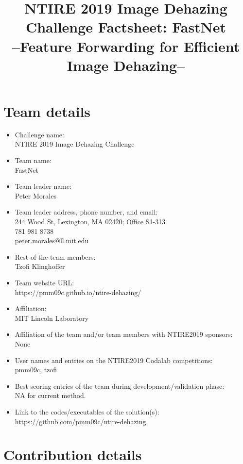 \documentclass[12pt]{article}
\title{NTIRE 2019 Image Dehazing Challenge Factsheet: FastNet\\--Feature Forwarding for Efficient Image Dehazing--}
\begin{document}
\maketitle
\sloppy

\section{Team details}

\begin{itemize}
\item Challenge name: \\ NTIRE 2019 Image Dehazing Challenge
\item Team name: \\FastNet                                 
\item Team leader name: \\Peter Morales                          
\item Team leader address, phone number, and email: \\244 Wood St, Lexington, MA 02420; Office S1-313\\ 781 981 8738\\ peter.morales@ll.mit.edu
\item Rest of the team members: \\Tzofi Klinghoffer       
\item Team website URL: \\https://pmm09c.github.io/ntire-dehazing/                    
\item Affiliation: \\MIT Lincoln Laboratory
\item Affiliation of the team and/or team members with NTIRE2019 sponsors: \\None
\item User names and entries on the NTIRE2019 Codalab competitions: \\pmm09c, tzofi
\item Best scoring entries of the team during development/validation phase: \\NA for current method.
\item Link to the codes/executables of the solution(s): \\https://github.com/pmm09c/ntire-dehazing
\end{itemize}

\section{Contribution details}
\end{document}

